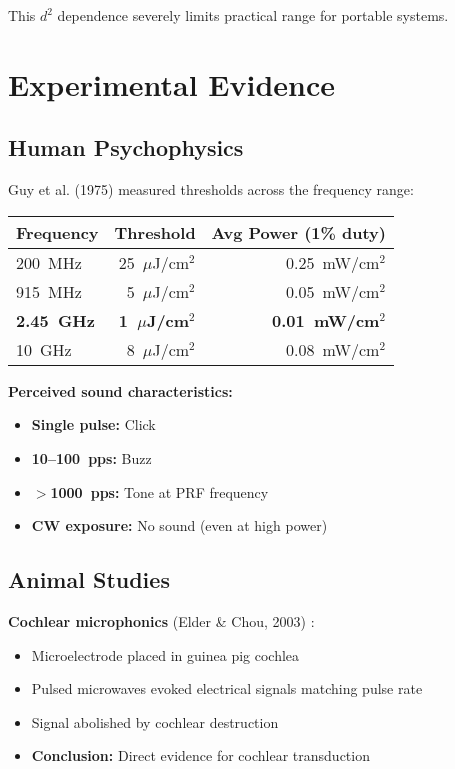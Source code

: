 This $d^2$ dependence severely limits practical range for portable systems.

\section{Experimental Evidence}

\subsection{Human Psychophysics}

Guy et al. (1975) \cite{Guy1975} measured thresholds across the frequency range:

\begin{center}
\begin{tabular}{@{}lrr@{}}
\toprule
\textbf{Frequency} & \textbf{Threshold} & \textbf{Avg Power (1\% duty)} \\
\midrule
200~MHz & 25~$\mu$J/cm$^2$ & 0.25~mW/cm$^2$ \\
915~MHz & 5~$\mu$J/cm$^2$ & 0.05~mW/cm$^2$ \\
\textbf{2.45~GHz} & \textbf{1~$\mu$J/cm$^2$} & \textbf{0.01~mW/cm$^2$} \\
10~GHz & 8~$\mu$J/cm$^2$ & 0.08~mW/cm$^2$ \\
\bottomrule
\end{tabular}
\end{center}

\textbf{Perceived sound characteristics:}
\begin{itemize}
\item \textbf{Single pulse:} Click
\item \textbf{10--100~pps:} Buzz
\item \textbf{$>$1000~pps:} Tone at PRF frequency
\item \textbf{CW exposure:} No sound (even at high power)
\end{itemize}

\subsection{Animal Studies}

\textbf{Cochlear microphonics} (Elder \& Chou, 2003) \cite{Elder2003}:
\begin{itemize}
\item Microelectrode placed in guinea pig cochlea
\item Pulsed microwaves evoked electrical signals matching pulse rate
\item Signal abolished by cochlear destruction
\item \textbf{Conclusion:} Direct evidence for cochlear transduction
\end{itemize}

